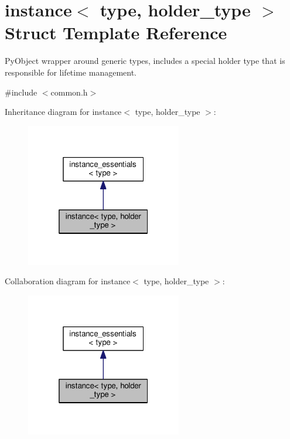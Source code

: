 \hypertarget{structinstance}{}\section{instance$<$ type, holder\+\_\+type $>$ Struct Template Reference}
\label{structinstance}


Py\+Object wrapper around generic types, includes a special holder type that is responsible for lifetime management.  




{\ttfamily \#include $<$common.\+h$>$}



Inheritance diagram for instance$<$ type, holder\+\_\+type $>$\+:
\nopagebreak
\begin{figure}[H]
\begin{center}
\leavevmode
\includegraphics[width=193pt]{structinstance__inherit__graph}
\end{center}
\end{figure}


Collaboration diagram for instance$<$ type, holder\+\_\+type $>$\+:
\nopagebreak
\begin{figure}[H]
\begin{center}
\leavevmode
\includegraphics[width=193pt]{structinstance__coll__graph}
\end{center}
\end{figure}
